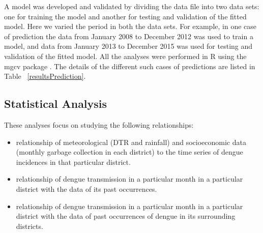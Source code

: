\documentclass{bmcart}
\begin{document}
A model was developed and validated by dividing the data file into two data sets: one for training the model and another for testing and validation of the fitted model. Here we varied the period in both the data sets. For example, in one case of prediction the data from January 2008 to December 2012 was used to train a model, and data from January 2013 to December 2015 was used for testing and validation of the fitted model. All the analyses were performed in R \cite{Rsoftware} using the mgcv package \cite{mgcv}.  The details of the different such cases of predictions are listed in Table ~\ref{resultsPrediction}.  













\subsection{Statistical Analysis} \label{stat}

These analyses focus on studying the following relationships:

\begin{itemize}
	\item relationship of meteorological (DTR and rainfall) and socioeconomic data (monthly garbage collection in each district) to the time series of dengue incidences in that particular district. 
	\item relationship of dengue transmission in a particular month in a particular district with the data of its past occurrences. 
	\item relationship of dengue transmission in a particular month in a particular district with the data of past occurrences of dengue in its surrounding districts. 
\end{itemize}
\end{document}
